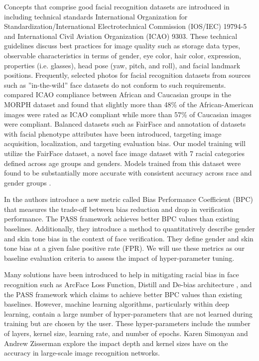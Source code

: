 \documentclass[conference]{IEEEtran}
\begin{document}
Concepts that comprise good facial recognition datasets are introduced in \cite{monnerat2007machine} including technical standards International Organization for Standardization/International Electrotechnical Commission (IOS/IEC) 19794-5 and International Civil Aviation Organization (ICAO) 9303. These technical guidelines discuss best practices for image quality such as storage data types, observable characteristics in terms of gender, eye color, hair color, expression, properties (i.e. glasses), head pose (yaw, pitch, and roll), and facial landmark positions. Frequently, selected photos for facial recognition datasets from sources such as ”in-the-wild” face datasets do not conform to such requirements. \cite{vangara2019characterizing} compared ICAO compliance between African and Caucasian groups in the MORPH \cite{ricanek2006morph} dataset and found that slightly more than 48\% of the African-American images were rated as ICAO compliant while more than 57\% of Caucasian images were compliant. Balanced datasets such as FairFace \cite{karkkainen2021fairface} and annotation of datasets with facial phenotype attributes \cite{yucer2022measuring} have been introduced, targeting image acquisition, localization, and targeting evaluation bias. Our model training will utilize the FairFace dataset, a novel face image dataset with 7 racial categories defined across age groups and genders. Models trained from this dataset were found to be substantially more accurate with consistent accuracy across race and gender groups \cite{karkkainen2021fairface}.

In \cite{dhar2021pass} the authors introduce a new metric called Bias Performance Coefficient (BPC) that measures the trade-off between bias reduction and drop in verification performance. The PASS framework achieves better BPC values than existing baselines. Additionally, they introduce a method to quantitatively describe gender and skin tone bias in the context of face verification. They define gender and skin tone bias at a given false positive rate (FPR). We will use these metrics as our baseline evaluation criteria to assess the impact of hyper-parameter tuning.

Many solutions have been introduced to help in mitigating racial bias in face recognition such as ArcFace Loss Function\cite{deng2019arcface}, Distill and De-bias architecture \cite{dhar2022distill}, and the PASS framework\cite{dhar2021pass} which claims to achieve better BPC values than existing baselines. However, machine learning algorithms, particularly within deep learning, contain a large number of hyper-parameters that are not learned during training but are chosen by the user. These hyper-parameters include the number of layers, kernel size, learning rate, and number of epochs\cite{hellstrom2020bias}. Karen Simonyan and Andrew Zisserman \cite{simonyan2014very} explore the impact depth and kernel sizes have on the accuracy in large-scale image recognition networks.
\end{document}
